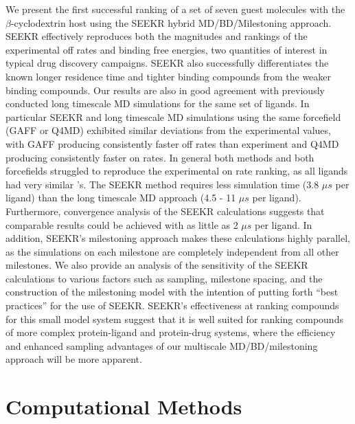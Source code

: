 \par We present the first successful ranking of a set of seven guest molecules
with the $\beta$-cyclodextrin host using the SEEKR hybrid MD/BD/Milestoning approach.
SEEKR effectively reproduces both the magnitudes and rankings of the
experimental off rates\cite{Fukahori2004,Fukahori2006,Nishikawa2002,Nishikawa2006,Rekharsky1998,Barros1998} and binding free energies, two quantities of interest in
typical drug discovery campaigns\cite{Lu2010a,Schuetz2017,Copeland2006b,Copeland2016}.
SEEKR also successfully differentiates the known longer residence time and
tighter binding compounds from the weaker binding compounds. Our results are also in good agreement
with previously conducted long timescale MD simulations for the same set of
ligands\cite{Tang2017}. In particular SEEKR and long timescale MD simulations
using the same forcefield (GAFF or Q4MD) exhibited similar deviations from the
experimental values, with GAFF producing consistently faster off rates than
experiment and Q4MD producing consistently faster on rates. In general both
methods and both forcefields struggled to reproduce the experimental on rate
ranking, as all ligands had very similar \kon's.
The SEEKR method requires less simulation time (3.8 ${\mu}s$ per ligand)
than the long timescale MD approach (4.5 - 11 ${\mu}s$ per ligand). Furthermore,
convergence analysis of the SEEKR calculations suggests that comparable results
could be achieved with as little as 2 ${\mu}s$ per ligand. In addition, SEEKR's
milestoning approach makes these calculations highly parallel, as the
simulations on each milestone are completely independent from all other milestones.
We also provide an analysis of the sensitivity of the SEEKR
calculations to various factors such as sampling, milestone spacing, and the
construction of the milestoning model with the intention of putting forth
``best practices'' for the use of SEEKR. SEEKR's effectiveness at ranking
compounds for this small model system suggest that it is well suited for ranking
compounds of more complex protein-ligand and protein-drug systems, where the
efficiency and enhanced sampling advantages of our multiscale MD/BD/milestoning
approach will be more apparent.


\section{Computational Methods}

